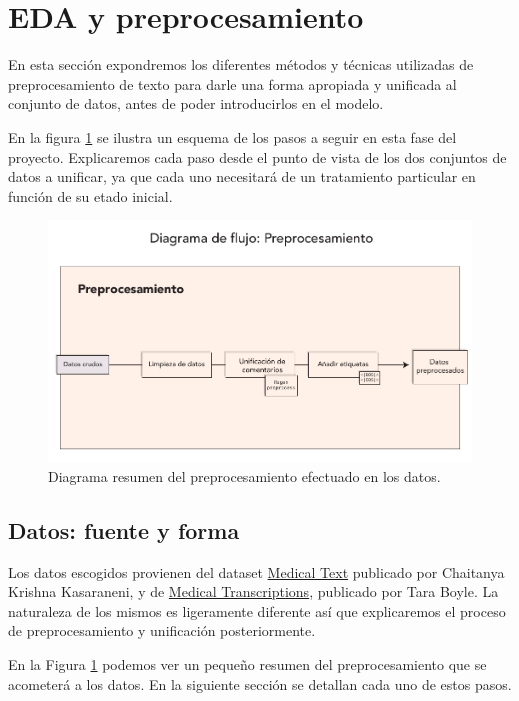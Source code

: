 \section{EDA y preprocesamiento}

En esta sección expondremos los diferentes métodos y técnicas utilizadas de preprocesamiento de texto para darle una forma apropiada y unificada al conjunto de datos, antes de poder introducirlos en el modelo.

En la figura \ref{fig:preprocess-diagram} se ilustra un esquema de los pasos a seguir en esta fase del proyecto. Explicaremos cada paso desde el punto de vista de los dos conjuntos de datos a unificar, ya que cada uno necesitará de un tratamiento particular en función de su etado inicial.

\begin{figure}[h!]
	\centering
	\includegraphics[width=.9\textwidth]{media/preprocess-diagram.pdf}
	\caption{Diagrama resumen del preprocesamiento efectuado en los datos.}
	\label{fig:preprocess-diagram}
\end{figure}


\subsection{Datos: fuente y forma}
Los datos escogidos provienen del dataset \href{https://www.kaggle.com/chaitanyakck/medical-text}{Medical Text} publicado por Chaitanya Krishna Kasaraneni, y de \href{https://www.kaggle.com/tboyle10/medicaltranscriptions}{Medical Transcriptions}, publicado por Tara Boyle. La naturaleza de los mismos es ligeramente diferente así que explicaremos el proceso de preprocesamiento y unificación posteriormente.

En la Figura \ref{fig:preprocess-diagram} podemos ver un pequeño resumen del preprocesamiento que se acometerá a los datos. En la siguiente sección se detallan cada uno de estos pasos.


